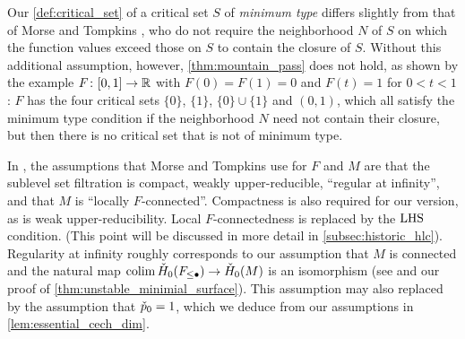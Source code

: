 \begin{rem}\label{rem:critical_set}
	Our \cref{def:critical_set} of a critical set $S$ of \emph{minimum type} differs slightly from that of Morse and Tompkins \cite[p.~466]{Morse.1939}, who do not require the neighborhood $N$ of $S$ on which the function values exceed those on $S$ to contain the closure of $S$.
	Without this additional assumption, however, \cref{thm:mountain_pass} does not hold, as shown by the example $F \colon [0,1] \to \mathbb{R}$ with $F(0) = F(1) = 0$ and $F(t) = 1$ for $0 < t < 1$:
	$F$ has the four critical sets $\{0\}$, $\{1\}$, $\{0\} \cup \{1\}$ and $(0,1)$, which all satisfy the minimum type condition if the neighborhood $N$ need not contain their closure, but then there is no critical set that is not of minimum type.
\end{rem}

\begin{rem}\label{rem:mountain_pass_assumptions}
    In \cite[Corollary 7.1]{Morse.1939}, the assumptions that Morse and Tompkins use for $F$ and $M$ are that the sublevel set filtration is compact,  weakly upper-reducible, ``regular at infinity'', and that $M$ is ``locally $F$-connected''.
    Compactness is also required for our version, as is weak upper-reducibility. 
    Local $F$-connectedness is replaced by the $\mathrm{LHS}$ condition.
    (This point will be discussed in more detail in \cref{subsec:historic_hlc}).
    Regularity at infinity roughly corresponds to our assumption that $M$ is connected and the natural map $\operatorname*{colim} \check{H}_0(F_{\leq \bullet}) \to \check{H}_0(M)$ is an isomorphism (see \cite[p.~444]{Morse.1939} and our proof of \cref{thm:unstable_minimial_surface}).
    This assumption may also replaced by the assumption that $\check{p}_0 = 1$, which we deduce from our assumptions in \cref{lem:essential_cech_dim}.
\end{rem}

